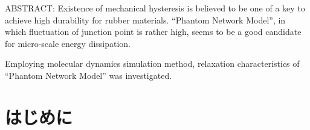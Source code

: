 \documentclass[uplatex,10pt,a4paper,twocolumn]{jsarticle}
\begin{document}


\begin{spacing}{0.9}
ABSTRACT: 
Existence of mechanical hysteresis is believed to be one of a key to achieve high durability for rubber materials.
``Phantom Network Model'', in which fluctuation of junction point is rather high, seems to be a good candidate for micro-scale energy dissipation.

Employing molecular dynamics simulation method, relaxation characteristics of ``Phantom Network Model'' was investigated.
\end{spacing}

\section{はじめに}

\end{document}

